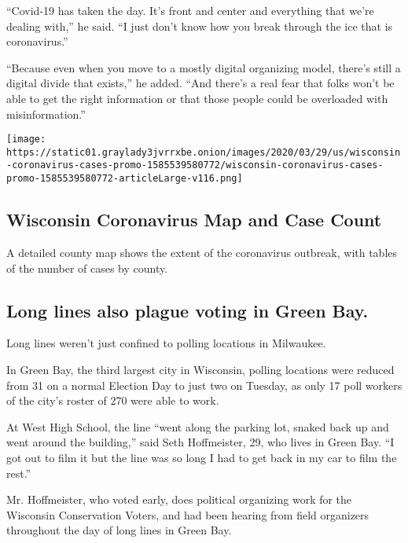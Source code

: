 ``Covid-19 has taken the day. It's front and center and everything that
we're dealing with,'' he said. ``I just don't know how you break through
the ice that is coronavirus.''

``Because even when you move to a mostly digital organizing model,
there's still a digital divide that exists,'' he added. ``And there's a
real fear that folks won't be able to get the right information or that
those people could be overloaded with misinformation.''

\href{https://www.nytimes3xbfgragh.onion/interactive/2020/us/wisconsin-coronavirus-cases.html}{}

\texttt{[image: https://static01.graylady3jvrrxbe.onion/images/2020/03/29/us/wisconsin-coronavirus-cases-promo-1585539580772/wisconsin-coronavirus-cases-promo-1585539580772-articleLarge-v116.png]}

\hypertarget{wisconsin-coronavirus-map-and-case-count}{%
\subsection{Wisconsin Coronavirus Map and Case
Count}\label{wisconsin-coronavirus-map-and-case-count}}

A detailed county map shows the extent of the coronavirus outbreak, with
tables of the number of cases by county.

\hypertarget{long-lines-also-plague-voting-in-green-bay}{%
\subsection{Long lines also plague voting in Green
Bay.}\label{long-lines-also-plague-voting-in-green-bay}}

Long lines weren't just confined to polling locations in Milwaukee.

In Green Bay, the third largest city in Wisconsin, polling locations
were reduced from 31 on a normal Election Day to just two on Tuesday, as
only 17 poll workers of the city's roster of 270 were able to work.

At West High School, the line ``went along the parking lot, snaked back
up and went around the building,'' said Seth Hoffmeister, 29, who lives
in Green Bay. ``I got out to film it but the line was so long I had to
get back in my car to film the rest.''

Mr. Hoffmeister, who voted early, does political organizing work for the
Wisconsin Conservation Voters, and had been hearing from field
organizers throughout the day of long lines in Green Bay.

